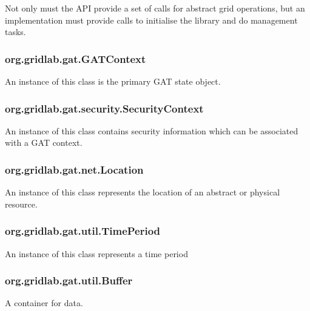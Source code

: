 \documentclass[$Date: 2003/06/26 19:29:31 $]{glabarticle}
\begin{document}
Not only must the API provide a set of calls for abstract grid operations, but an implementation must provide 
calls to initialise the library and do management tasks.

\subsubsection{org.gridlab.gat.GATContext}

An instance of this class is the primary GAT state object.

\subsubsection{org.gridlab.gat.security.SecurityContext}

An instance of this class contains security information which can be associated with a GAT context.

\subsubsection{org.gridlab.gat.net.Location} 

An instance of this class represents the location of an abstract or physical resource.

\subsubsection{org.gridlab.gat.util.TimePeriod}

An instance of this class represents a time period

\subsubsection{org.gridlab.gat.util.Buffer}

A container for data.

\end{document}
